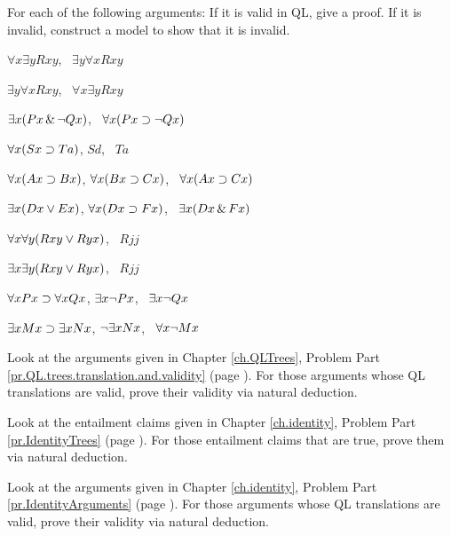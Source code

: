 \solutions
\problempart
\label{pr.QLvalidornot}
For each of the following arguments: If it is valid in QL, give a proof. If it is invalid, construct a model to show that it is invalid.
\begin{earg}
\item $\forall x\exists y Rxy$, \therefore\ $\exists y\forall x Rxy$
\item $\exists y\forall x Rxy$, \therefore\ $\forall x\exists y Rxy$
\item $\exists x(Px \,\&\, \neg Qx)$, \therefore\ $\forall x(Px \supset \neg Qx)$
\item $\forall x(Sx \supset Ta)$, $Sd$, \therefore\ $Ta$
\item $\forall x(Ax\supset Bx)$, $\forall x(Bx \supset Cx)$, \therefore\ $\forall x(Ax \supset Cx)$
\item $\exists x(Dx \vee Ex)$, $\forall x(Dx \supset Fx)$, \therefore\ $\exists x(Dx \,\&\, Fx)$
\item $\forall x\forall y(Rxy \vee Ryx)$, \therefore\ $Rjj$
\item $\exists x\exists y(Rxy \vee Ryx)$, \therefore\ $Rjj$
\item $\forall x Px \supset \forall x Qx$, $\exists x \neg Px$, \therefore\ $\exists x \neg Qx$
\item $\exists x Mx \supset \exists x Nx$, $\neg \exists x Nx$, \therefore\ $\forall x \neg Mx$
\end{earg}

\problempart
\label{pr.QLND.trees1}
Look at the arguments given in Chapter \ref{ch.QLTrees}, Problem Part \ref{pr.QL.trees.translation.and.validity} (page \pageref{pr.QL.trees.translation.and.validity}). For those arguments whose QL translations are valid, prove their validity via natural deduction.

\problempart
\label{pr.QLND.trees2}
Look at the entailment claims given in Chapter \ref{ch.identity}, Problem Part \ref{pr.IdentityTrees} (page \pageref{pr.IdentityTrees}). For those entailment claims that are true, prove them via natural deduction.

\problempart
\label{pr.QLND.trees3}
Look at the arguments given in Chapter \ref{ch.identity}, Problem Part \ref{pr.IdentityArguments} (page \pageref{pr.IdentityArguments}). For those arguments whose QL translations are valid, prove their validity via natural deduction.
